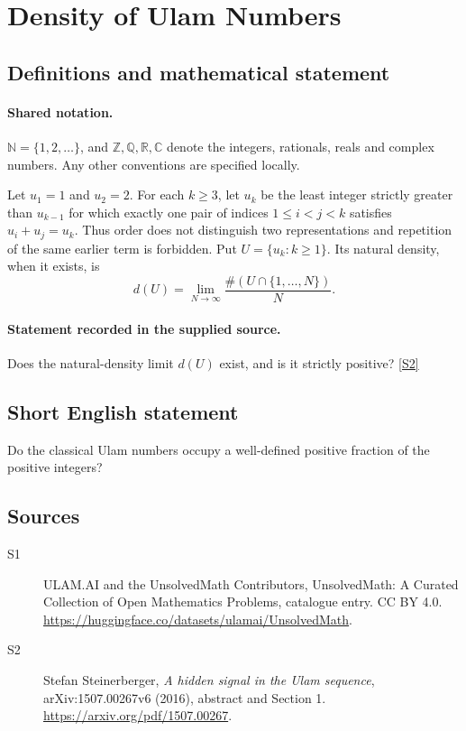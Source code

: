 \documentclass[11pt]{article}
\newcommand{\sref}[2]{\hyperlink{source:#1:#2}{[S#2]}}
\begin{document}
\section{Density of Ulam Numbers}\label{statement}

\subsection{Definitions and mathematical statement}

\paragraph{Shared notation.}$\mathbb N=\{1,2,\ldots\}$, and $\mathbb Z,\mathbb Q,\mathbb R,\mathbb C$ denote the integers, rationals, reals and complex numbers. Any other conventions are specified locally.


Let $u_1=1$ and $u_2=2$. For each $k\geq3$, let $u_k$ be the least integer strictly greater than $u_{k-1}$ for which exactly one pair of indices $1\leq i<j<k$ satisfies $u_i+u_j=u_k$. Thus order does not distinguish two representations and repetition of the same earlier term is forbidden. Put $U=\{u_k:k\geq1\}$. Its natural density, when it exists, is
\[
d(U)=\lim_{N\to\infty}\frac{\#(U\cap\{1,\ldots,N\})}{N}.
\]
\paragraph{Statement recorded in the supplied source.}
Does the natural-density limit $d(U)$ exist, and is it strictly positive? \sref{statement}{2}

\subsection{Short English statement}
Do the classical Ulam numbers occupy a well-defined positive fraction of the positive integers?
\subsection{Sources}
\begin{description}
\item[\hypertarget{source:statement:1}{S1}] ULAM.AI and the UnsolvedMath Contributors, UnsolvedMath: A Curated Collection of Open Mathematics Problems, catalogue entry. CC BY 4.0. \url{https://huggingface.co/datasets/ulamai/UnsolvedMath}.
\item[\hypertarget{source:statement:2}{S2}] Stefan Steinerberger, \emph{A hidden signal in the Ulam sequence}, arXiv:1507.00267v6 (2016), abstract and Section 1. \url{https://arxiv.org/pdf/1507.00267}.
\end{description}
\label{end:statement}
\end{document}
